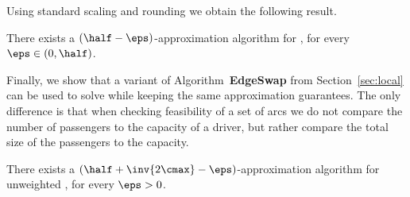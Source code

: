 Using standard scaling and rounding we obtain the following result.

\begin{theorem}
There exists a $(\half-\eps)$-approximation algorithm for \gcp,
for every $\eps \in (0,\half)$.
\end{theorem}


Finally, we show that a variant of Algorithm~\textbf{EdgeSwap} from
Section~\ref{sec:local} can be used to solve \gcp while keeping the
same approximation guarantees. 
%
The only difference is that when checking feasibility of a set of arcs
we do not compare the number of passengers to the capacity of a
driver, but rather compare the total size of the passengers to the
capacity.

\begin{theorem}
There exists a $(\half + \inv{2\cmax} - \eps)$-approximation algorithm
for unweighted \gcp, for every $\eps>0$.
\end{theorem}




